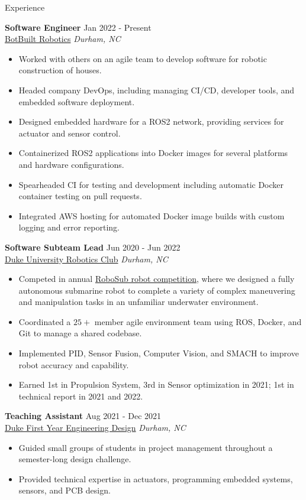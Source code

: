 \documentclass{resume}
\begin{document}
\begin{rSection}{Experience}

\textbf{Software Engineer} \hfill Jan 2022 - Present\\
\href{https://botbuilt.com}{BotBuilt Robotics} \hfill \textit{Durham, NC}
\begin{itemize}
    \itemsep -3pt {} 
    \item Worked with others on an agile team to develop software for robotic construction of houses.
    \item Headed company DevOps, including managing CI/CD, developer tools, and embedded software deployment.
    \item Designed embedded hardware for a ROS2 network, providing services for actuator and sensor control.
    \item Containerized ROS2 applications into Docker images for several platforms and hardware configurations.
    \item Spearheaded CI for testing and development including automatic Docker container testing on pull requests.
    \item Integrated AWS hosting for automated Docker image builds with custom logging and error reporting.
    \end{itemize}
 
\textbf{Software Subteam Lead} \hfill Jun 2020 - Jun 2022\\
\href{https://duke-robotics.com/}{Duke University Robotics Club} \hfill \textit{Durham, NC}
\begin{itemize}
    \itemsep -3pt {} 
    \item Competed in annual \href{https://robonation.org/programs/robosub/}{RoboSub robot competition}, where we designed a fully autonomous submarine robot to complete a variety of complex maneuvering and manipulation tasks in an unfamiliar underwater environment.
    \item Coordinated a $25+$ member agile environment team using ROS, Docker, and Git to manage a shared codebase.
    \item Implemented PID, Sensor Fusion, Computer Vision, and SMACH to improve robot accuracy and capability.
    \item Earned 1st in Propulsion System, 3rd in Sensor optimization in 2021; 1st in technical report in 2021 and 2022.    
\end{itemize}

\textbf{Teaching Assistant} \hfill Aug 2021 - Dec 2021\\
\href{https://fyd.duke.edu/}{Duke First Year Engineering Design} \hfill \textit{Durham, NC}
\begin{itemize}
    \itemsep -3pt {} 
    \item Guided small groups of students in project management throughout a semester-long design challenge.
    \item Provided technical expertise in actuators, programming embedded systems, sensors, and PCB design.\
\end{itemize}


\end{rSection}
\end{document}

